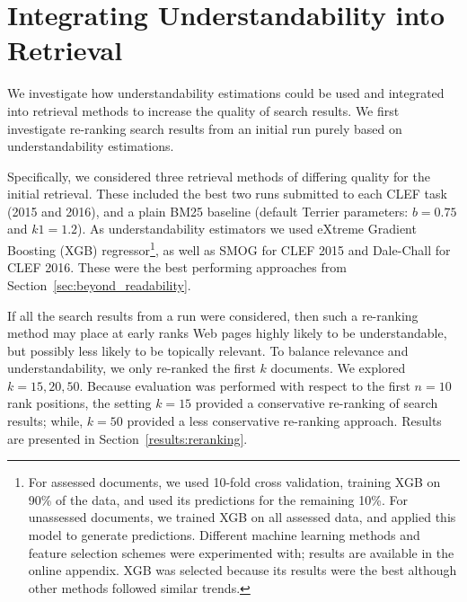 \section{Integrating Understandability into Retrieval}
\label{sec:experiments}

We investigate how understandability estimations could be used and integrated into retrieval methods to increase the quality of search results. We first investigate re-ranking search results from an initial run purely based on understandability estimations. 

Specifically, we considered three retrieval methods of differing quality for the initial retrieval. These included the best two runs submitted to each CLEF task (2015 and 2016), and a plain BM25 baseline (default Terrier parameters: $b=0.75$ and $k1=1.2$). As understandability estimators we used eXtreme Gradient Boosting (XGB) regressor\footnote{For assessed documents, we used 10-fold cross validation, training XGB on 90\% of the data, and used its predictions for the remaining 10\%. For unassessed documents, we trained XGB on all assessed data, and applied this model to generate predictions. Different machine learning methods and feature selection schemes were experimented with; results are available in the online appendix. XGB was selected because its results were the best although other methods followed similar trends.}\cite{chen16}, as well as SMOG for CLEF 2015 and Dale-Chall for CLEF 2016. These were the best performing approaches from Section~\ref{sec:beyond_readability}.

If all the search results from a run were considered, then such a re-ranking method may place at early ranks Web pages highly likely to be understandable, but possibly less likely to be topically relevant. To balance relevance and understandability, we only re-ranked the first $k$ documents. We explored $k = 15, 20, 50$. Because evaluation was performed with respect to the first $n=10$ rank positions, the setting $k=15$ provided a conservative re-ranking of search results; while, $k=50$ provided a less conservative re-ranking approach. Results are presented in Section~\ref{results:reranking}.

